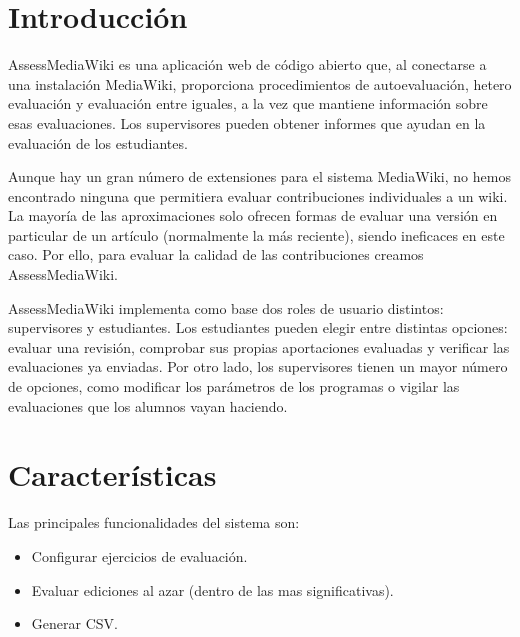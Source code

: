 

\section{Introducción}
AssessMediaWiki es una aplicación web de código abierto que, al conectarse a una instalación MediaWiki, proporciona procedimientos de autoevaluación, hetero evaluación y evaluación entre iguales, a la vez que mantiene información sobre esas evaluaciones. Los supervisores pueden obtener informes que ayudan en la evaluación de los estudiantes.
\newline

Aunque hay un gran número de extensiones para el sistema MediaWiki, no hemos encontrado ninguna que permitiera evaluar contribuciones individuales a un wiki. La mayoría de las aproximaciones solo ofrecen formas de evaluar una versión en particular de un artículo (normalmente la más reciente), siendo ineficaces en este caso. Por ello, para evaluar la calidad de las contribuciones creamos AssessMediaWiki.
\newline

AssessMediaWiki implementa como base dos roles de usuario distintos: supervisores y estudiantes. Los estudiantes pueden elegir entre distintas opciones: evaluar una revisión, comprobar sus propias aportaciones evaluadas y verificar las evaluaciones ya enviadas. Por otro lado, los supervisores tienen un mayor número de opciones, como modificar los parámetros de los programas o vigilar las evaluaciones que los alumnos vayan haciendo.
\newline

\section{Características}
Las principales funcionalidades del sistema son:
\begin{itemize}
	\item Configurar ejercicios de evaluación.
	\item Evaluar ediciones al azar (dentro de las mas significativas).
	\item Generar CSV.
\end{itemize}

